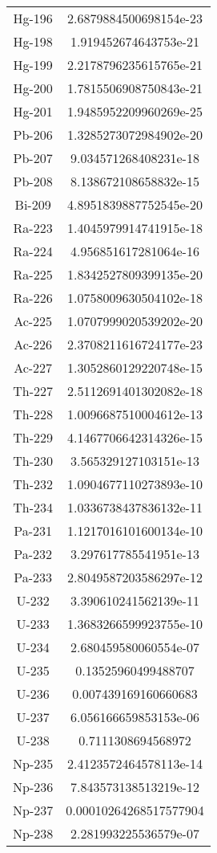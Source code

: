 \begin{table}[h!]
\begin{tabular}{|| c || c |}
Hg-196 & 2.6879884500698154e-23 \\
Hg-198 & 1.919452674643753e-21 \\
Hg-199 & 2.2178796235615765e-21 \\
Hg-200 & 1.7815506908750843e-21 \\
Hg-201 & 1.9485952209960269e-25 \\
Pb-206 & 1.3285273072984902e-20 \\
Pb-207 & 9.034571268408231e-18 \\
Pb-208 & 8.138672108658832e-15 \\
Bi-209 & 4.8951839887752545e-20 \\
Ra-223 & 1.4045979914741915e-18 \\
Ra-224 & 4.956851617281064e-16 \\
Ra-225 & 1.8342527809399135e-20 \\
Ra-226 & 1.0758009630504102e-18 \\
Ac-225 & 1.0707999020539202e-20 \\
Ac-226 & 2.3708211616724177e-23 \\
Ac-227 & 1.3052860129220748e-15 \\
Th-227 & 2.5112691401302082e-18 \\
Th-228 & 1.0096687510004612e-13 \\
Th-229 & 4.1467706642314326e-15 \\
Th-230 & 3.565329127103151e-13 \\
Th-232 & 1.0904677110273893e-10 \\
Th-234 & 1.0336738437836132e-11 \\
Pa-231 & 1.1217016101600134e-10 \\
Pa-232 & 3.297617785541951e-13 \\
Pa-233 & 2.8049587203586297e-12 \\
U-232 & 3.390610241562139e-11 \\
U-233 & 1.3683266599923755e-10 \\
U-234 & 2.680459580060554e-07 \\
U-235 & 0.13525960499488707 \\
U-236 & 0.007439169160660683 \\
U-237 & 6.056166659853153e-06 \\
U-238 & 0.7111308694568972 \\
Np-235 & 2.4123572464578113e-14 \\
Np-236 & 7.843573138513219e-12 \\
Np-237 & 0.00010264268517577904 \\
Np-238 & 2.281993225536579e-07 \\

\end{tabular}
\end{table}
